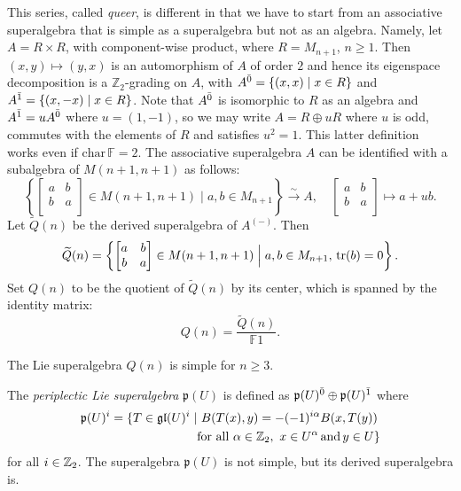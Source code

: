 This series, called \emph{queer}, is different in that we have to start from an associative superalgebra that is simple as a superalgebra but not as an algebra. Namely, let $A=R\times R$, with component-wise product, where $R=M_{n+1}$, $n\ge 1$. Then $(x,y)\mapsto(y,x)$ is an automorphism of $A$ of order $2$ and hence its eigenspace decomposition is a $\mathbb{Z}_2$-grading on $A$, with $A^{\bar{0}}=\{(x,x)\;|\;x\in R\}$ and $A^{\bar{1}}=\{(x,-x)\;|\;x\in R\}$. Note that $A^{\bar{0}}$ is isomorphic to $R$ as an algebra and $A^{\bar{1}}=uA^{\bar{0}}$ where $u=(1,-1)$, so we may write $A=R\oplus uR$ where $u$ is odd, commutes with the elements of $R$ and satisfies $u^2=1$. This latter definition works even if $\mathrm{char}\,\mathbb{F}=2$. The associative superalgebra $A$ can be identified with a subalgebra of $M(n+1,n+1)$ as follows:
\[
	\left\{
	\left[
		\begin{matrix}
			a & b \\
			b & a \\
		\end{matrix}
		\right] \in M(n+1,n+1) \; \Big| \;
	a,b \in M_{n+1} \right\}\stackrel{\sim}{\to}A,\quad
	\left[\begin{matrix}
			a & b \\
			b & a \\
		\end{matrix}\right]\mapsto a+ub.
\]
Let $\widetilde{Q}(n)$ be the derived superalgebra of $A^{(-)}$. Then
\[
	\widetilde{Q} (n) = \left\{
	\left[
		\begin{matrix}
			a & b \\
			b & a \\
		\end{matrix}
		\right] \in M(n+1,n+1) \; \Big| \;
	a,b \in M_{n+1},\,\operatorname{tr}(b)=0 \right\}.
\]
Set $Q(n)$ to be the quotient of $\widetilde{Q}(n)$ by its center, which is spanned by the identity matrix:
\[
	Q(n)=\frac{\widetilde{Q} (n)}{\mathbb{F}1}.
\]

The Lie superalgebra $Q(n)$ is simple for $n\geq 3$.

The \emph{periplectic Lie superalgebra} $\mathfrak{p}(U)$ is defined as $\mathfrak{p}(U)^{\bar0} \oplus \mathfrak{p}(U)^{\bar1}$ where \[\begin{aligned}
		\mathfrak{p}(U)^{i} = \{T\in \mathfrak{gl}(U)^i\mid&\,\, B(T(x),y) = - (-1)^{i\alpha}B(x,T(y))\\ &\text{for all}\,\,\alpha\in\mathbb{Z}_{2},\,\, x\in U^{\alpha} \,\text{and}\, y\in U\}\end{aligned}\] for all $i\in\mathbb{Z}_{2}$. The superalgebra $\mathfrak{p}(U)$ is not simple, but its derived superalgebra is.

